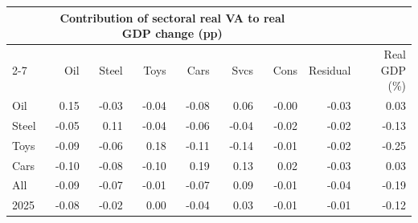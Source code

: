 \begin{tabular}{lrrrrrrrr}
\toprule
 & \multicolumn{6}{c}{Contribution of sectoral real VA to real GDP change (pp)} & & \\
\cmidrule(lr){2-7}
 & Oil & Steel & Toys & Cars & Svcs & Cons & Residual & Real GDP (\%) \\
\midrule
Oil & 0.15 & -0.03 & -0.04 & -0.08 & 0.06 & -0.00 & -0.03 & 0.03 \\
Steel & -0.05 & 0.11 & -0.04 & -0.06 & -0.04 & -0.02 & -0.02 & -0.13 \\
Toys & -0.09 & -0.06 & 0.18 & -0.11 & -0.14 & -0.01 & -0.02 & -0.25 \\
Cars & -0.10 & -0.08 & -0.10 & 0.19 & 0.13 & 0.02 & -0.03 & 0.03 \\
All & -0.09 & -0.07 & -0.01 & -0.07 & 0.09 & -0.01 & -0.04 & -0.19 \\
2025 & -0.08 & -0.02 & 0.00 & -0.04 & 0.03 & -0.01 & -0.01 & -0.12 \\
\bottomrule
\end{tabular}
